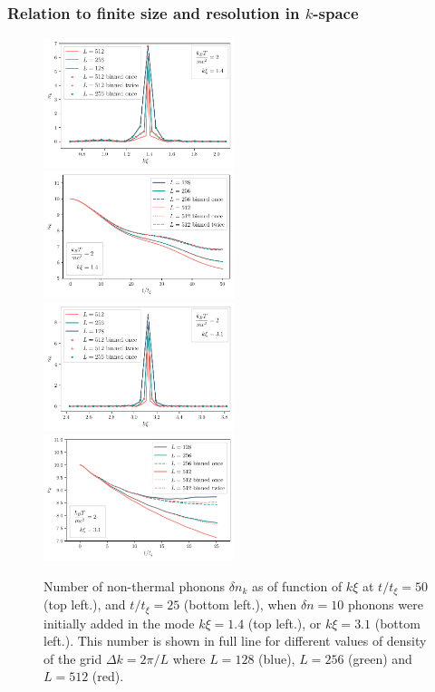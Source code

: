 \documentclass[aps,prd,notitlepage,amsfonts,amssymb,amsmath,nofootinbib,superscriptaddress,longbibliography]{revtex4-2}
\begin{document}
\begin{appendices}
\begin{figure}
\end{figure}



\subsubsection{Relation to finite size and resolution in $k$-space}

\begin{figure}
    \centering
    \includegraphics[width=0.495\textwidth]{fig13a.pdf}
    \includegraphics[width=0.495\textwidth]{fig13b.pdf}
    \includegraphics[width=0.495\textwidth]{fig13c.pdf}
    \includegraphics[width=0.495\textwidth]{fig13d.pdf}
    \caption{Number of non-thermal phonons $\delta n_k$ as of function of $k \xi$ at $t /t_{\xi} = 50$ (top left.), and $t /t_{\xi} = 25$ (bottom left.), when $\delta n = 10$ phonons were initially added in the mode $k \xi = 1.4$ (top left.), or $k \xi = 3.1$ (bottom left.). This number is shown in full line for different values of density of the grid $\Delta k = 2 \pi / L$ where $L= 128$ (blue), $L= 256$ (green) and $L= 512$ (red).
}
\end{figure}
\end{appendices}
\end{document}

